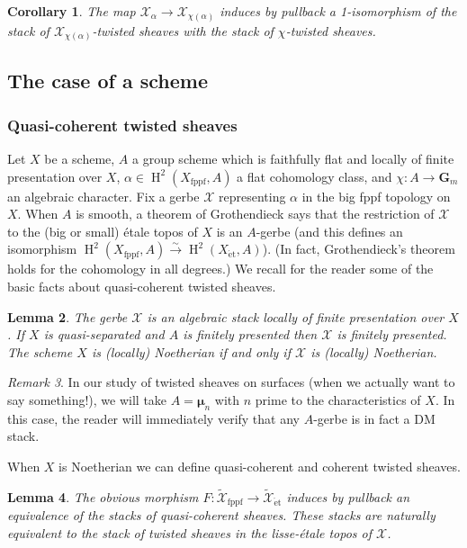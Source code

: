 \documentclass[11pt]{amsart}
\newcommand{\field}[1]{\mathbf #1}
\newcommand{\ms}[1]{\mathscr #1}
\newcommand{\simto}{\stackrel{\sim}{\to}}
\newcommand{\m}{\boldsymbol{\mu}}
\newcommand{\G}{\field G} %
\newcommand{\etale}{\operatorname{\acute{e}t}}
\renewcommand{\H}{\operatorname{H}}
\newcommand{\fppf}{\operatorname{fppf}}
\newcommand{\liset}{\operatorname{lis-\!\etale}}
\renewcommand{\[}{[\!\hspace{0.03em}[}
\renewcommand{\]}{]\!\hspace{0.03em}]}
\renewcommand{\(}{(\!\hspace{0.03em}(}
\renewcommand{\)}{)\!\hspace{0.03em})}
\newtheorem{lem}{Lemma}[subsubsection]%
\newtheorem{cor}[lem]{Corollary}
\theoremstyle{definition}
\theoremstyle{remark}
\newtheorem{remark}[lem]{Remark}
\begin{document}
\begin{cor}\label{C:character means nothing} The map $\ms X_{\alpha}\to\ms X_{\chi(\alpha)}$ induces 
by pullback a 1-isomorphism of the stack of $\ms 
X_{\chi(\alpha)}$-twisted sheaves with the stack of $\chi$-twisted 
sheaves. 
\end{cor}


\subsection{The case of a scheme}\label{S:the case of a scheme}

\subsubsection{Quasi-coherent twisted sheaves}

Let $X$ be a scheme, $A$ a group scheme which is faithfully flat and locally of finite 
presentation over $X$, 
$\alpha\in\H^{2}(X_{\fppf},A)$ a flat cohomology class, and $\chi:A\to\G_{m}$ an 
algebraic character.  Fix a gerbe $\ms X$ representing $\alpha$ in the 
big fppf topology on $X$.  When $A$ is smooth, a theorem of 
Grothendieck \cite[Appendix]{grothbrauer2} says that the restriction of $\ms X$ to the (big or small) 
\'etale topos of $X$ is an $A$-gerbe (and this defines an 
isomorphism $\H^{2}(X_{\fppf},A)\simto\H^{2}(X_{\etale},A)$).  (In fact, 
Grothendieck's theorem holds for the cohomology in all 
degrees.)  We recall for the reader some of the basic facts about 
quasi-coherent twisted sheaves.

\begin{lem} The gerbe $\ms X$ is an algebraic stack locally of finite 
presentation over $X$.  If $X$ is quasi-separated and $A$ is finitely presented then $\ms X$ is 
finitely presented.  The scheme $X$ is (locally) Noetherian if and 
only if $\ms X$ is (locally) Noetherian.
\end{lem}

\begin{remark} In our study of twisted sheaves on surfaces (when we 
actually want to say something!), we will take $A=\m_{n}$ with $n$ prime 
to the characteristics of $X$.  In this case, the reader will 
immediately verify that any $A$-gerbe is in fact a DM stack.
\end{remark}

When $X$ is Noetherian we can define quasi-coherent and coherent 
twisted sheaves.

\begin{lem} The obvious morphism $F:\widetilde{\ms 
X}_{\fppf}\to\widetilde{\ms X}_{\etale}$ induces by pullback an 
equivalence of the stacks of quasi-coherent sheaves.  These stacks are naturally equivalent to the stack of twisted sheaves in the lisse-\'etale topos of $\ms X$.  
\end{lem}
\end{document}
